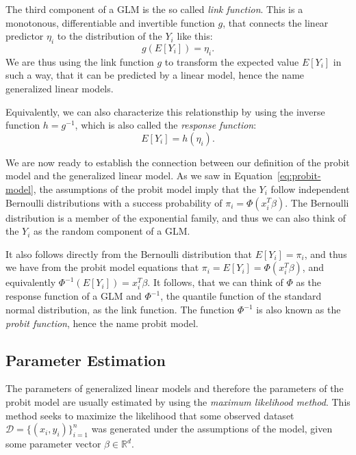 The third component of a GLM is the so called \textit{link function}.
This is a monotonous, differentiable and invertible function
$g$,
that connects the linear predictor $\eta_i$ to the distribution of the
$Y_i$ like this:
\begin{equation*}
    g(E[Y_i]) = \eta_i.
\end{equation*}
We are thus using the link function $g$ to transform the expected value
$E[Y_i]$ in such a way, that it can be predicted by a linear model,
hence the name generalized linear models.

Equivalently, we can also characterize this relationsthip by using
the inverse function $h = g^{-1}$,
which is also called the \textit{response function}:
\begin{equation*}
    E[Y_i] = h(\eta_i).
\end{equation*}

We are now ready to establish the connection between
our definition of the probit model and
the generalized linear model.
As we saw in Equation~\ref{eq:probit-model}, the assumptions of the
probit model imply that the $Y_i$ follow independent Bernoulli distributions
with a success probability of $\pi_i = \Phi(x_i^T \beta)$.
The Bernoulli distribution is a member of the exponential family, and
thus we can also think of the $Y_i$ as the random component of a GLM.

It also follows directly from the Bernoulli distribution that
$E[Y_i] = \pi_i$, and thus we have from the probit model equations that
$\pi_i = E[Y_i] = \Phi(x_i^T \beta)$, and equivalently
$\Phi^{-1}(E[Y_i]) = x_i^T \beta$. It follows,
that we can think of $\Phi$ as the response
function of a GLM and $\Phi^{-1}$, the quantile function
of the standard normal distribution, as the link function.
The function $\Phi^{-1}$ is also known as the \textit{probit function},
hence the name probit model.

\subsection{Parameter Estimation}
\label{sec:parameter-estimation}

The parameters of generalized linear models and therefore the parameters
of the probit model are usually
estimated by using the \textit{maximum likelihood method}.
This method seeks to maximize the likelihood that some observed
dataset $\mathcal{D} = \{(x_i, y_i)\}_{i=1}^n$ was generated under the
assumptions of the model, given some parameter vector
$\beta \in \mathbb{R}^d$.

